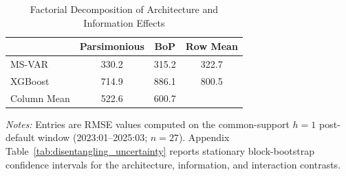 \begin{table}[htbp]
\centering
\caption{Factorial Decomposition of Architecture and Information Effects}
\label{tab:did}
\begin{tabular}{lcc|c}
\toprule
& Parsimonious & BoP & Row Mean \\
\midrule
MS-VAR & 330.2 & 315.2 & 322.7 \\
XGBoost & 714.9 & 886.1 & 800.5 \\
\midrule
Column Mean & 522.6 & 600.7 & \\
\bottomrule
\end{tabular}
\begin{tablenotes}
\small
\item \textit{Notes:} Entries are RMSE values computed on the common-support $h=1$ post-default window (2023:01--2025:03; $n=27$). Appendix Table~\ref{tab:disentangling_uncertainty} reports stationary block-bootstrap confidence intervals for the architecture, information, and interaction contrasts.
\end{tablenotes}
\end{table}
